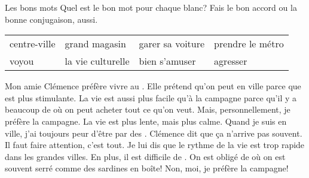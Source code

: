 \begin{frame}{Les bons mots}
  \small
  Quel est le bon mot pour chaque blanc?
  Fais le bon accord ou la bonne conjugaison, aussi.\\
  \begin{center}
    \begin{tabular}{| l l l l |}
      \hline
      centre-ville & grand magasin     & garer sa voiture & prendre le métro \\
      voyou        & la vie culturelle & bien s'amuser    & agresser \\
      \hline
    \end{tabular}
  \end{center}
  Mon amie Clémence préfère vivre au \underline{}.
  Elle prétend qu'on peut \underline{} en ville parce que \underline{} est plus stimulante.
  La vie est aussi plus facile qu'à la campagne parce qu'il y a beaucoup de \underline{} où on peut acheter tout ce qu'on veut.
  Mais, personnellement, je préfère la campagne.
  La vie est plus lente, mais plus calme.
  Quand je suis en ville, j'ai toujours peur d'être \underline{} par des \underline{}.
  Clémence dit que ça n'arrive pas souvent.
  Il faut faire attention, c'est tout.
  Je lui dis que le rythme de la vie est trop rapide dans les grandes villes.
  En plus, il est difficile de \underline{}.
  On est obligé de \underline{} où on est souvent serré comme des sardines en boîte!
  Non, moi, je préfère la campagne!
\end{frame}